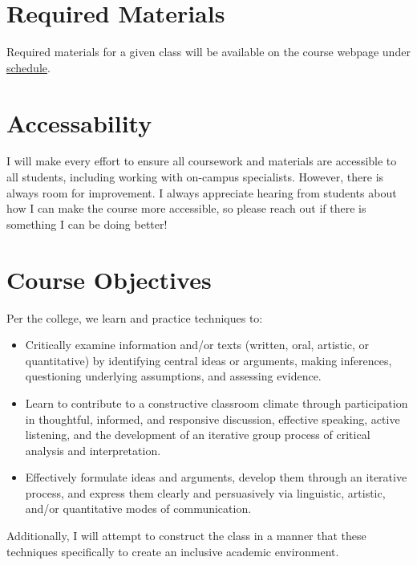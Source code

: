 \documentclass[11pt]{article}
\begin{document}

\section*{Required Materials}

Required materials for a given class will be available on the course webpage under \href{https://cd-public.github.io/courses/soc/sched.html}{schedule}.




\section*{Accessability}

I will make every effort to ensure all coursework and materials are accessible to all students, including working with on-campus specialists. However, there is always room for improvement. I always appreciate hearing from students about how I can make the course more accessible, so please reach out if there is something I can be doing better!


\section*{Course Objectives}
Per the college, we learn and practice techniques to:
\begin{itemize}
\item Critically examine information and/or texts (written, oral, artistic, or quantitative) by identifying central ideas or arguments, making inferences, questioning underlying assumptions, and assessing evidence.
\item Learn to contribute to a constructive classroom climate through participation in thoughtful, informed, and responsive discussion, effective speaking, active listening, and the development of an iterative group process of critical analysis and interpretation.
\item Effectively formulate ideas and arguments, develop them through an iterative process, and express them clearly and persuasively via linguistic, artistic, and/or quantitative modes of communication.
\end{itemize}
Additionally, I will attempt to construct the class in a manner that these techniques specifically to create an inclusive academic environment.
\end{document}
